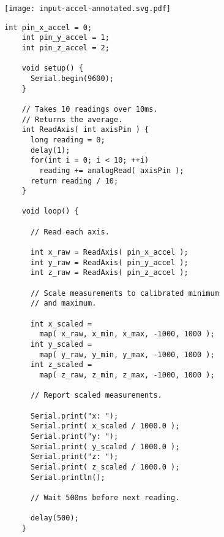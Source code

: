 \vspace{0.1in}
\begin{minipage}[t]{0.49\tw}

  \vspace{0.1in}
  \texttt{[image: input-accel-annotated.svg.pdf]}

\end{minipage}
\hfill
\begin{minipage}[t]{0.49\tw}
  \vspace{0.1in}
  \begin{Verbatim}[gobble=3,fontsize=\small]
    int pin_x_accel = 0;
    int pin_y_accel = 1;
    int pin_z_accel = 2;

    void setup() {
      Serial.begin(9600);
    }

    // Takes 10 readings over 10ms.
    // Returns the average.
    int ReadAxis( int axisPin ) {
      long reading = 0;
      delay(1);
      for(int i = 0; i < 10; ++i)
        reading += analogRead( axisPin );
      return reading / 10;
    }

    void loop() {

      // Read each axis.

      int x_raw = ReadAxis( pin_x_accel );
      int y_raw = ReadAxis( pin_y_accel );
      int z_raw = ReadAxis( pin_z_accel );

      // Scale measurements to calibrated minimum
      // and maximum.

      int x_scaled =
        map( x_raw, x_min, x_max, -1000, 1000 );
      int y_scaled =
        map( y_raw, y_min, y_max, -1000, 1000 );
      int z_scaled =
        map( z_raw, z_min, z_max, -1000, 1000 );

      // Report scaled measurements.

      Serial.print("x: ");
      Serial.print( x_scaled / 1000.0 );
      Serial.print("y: ");
      Serial.print( y_scaled / 1000.0 );
      Serial.print("z: ");
      Serial.print( z_scaled / 1000.0 );
      Serial.println();

      // Wait 500ms before next reading.

      delay(500);
    }
  \end{Verbatim}
\end{minipage}
\vspace{0.1in}


